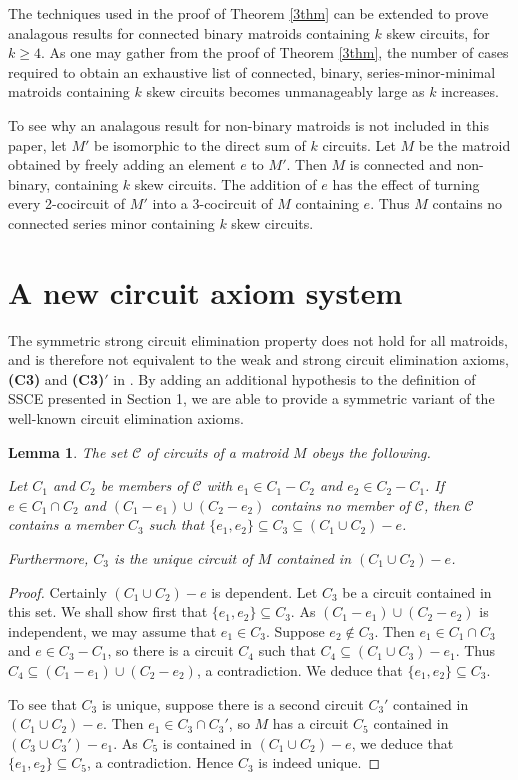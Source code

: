 \documentclass[12pt,reqno]{amsart}
\newtheorem{lemma}[theorem]{Lemma}
\theoremstyle{definition}
\theoremstyle{remark}
\numberwithin{equation}{section}
\begin{document}
The techniques used in the proof of Theorem \ref{3thm} can be extended to prove analagous results for connected binary matroids containing $k$ skew circuits, for $k\ge 4$. As one may gather from the proof of Theorem \ref{3thm}, the number of cases required to obtain an exhaustive list of connected, binary, series-minor-minimal matroids containing $k$ skew circuits becomes unmanageably large as $k$ increases.  

To see why an analagous result for non-binary matroids is not included in this paper, let $M'$ be isomorphic to the direct sum of $k$ circuits. Let $M$ be the matroid obtained by freely adding an element $e$ to $M'$. Then $M$ is connected and non-binary, containing $k$ skew circuits. The addition of $e$ has the effect of turning every 2-cocircuit of $M'$ into a 3-cocircuit of $M$ containing $e$. Thus $M$ contains no connected series minor containing $k$ skew circuits.       

\section{A new circuit axiom system}
The symmetric strong circuit elimination property does not hold for all matroids, and is therefore not equivalent to the weak and strong circuit elimination axioms, \textbf{(C3)} and \textbf{(C3)$'$} in \cite[pp.9 and 29]{ox}. By adding an additional hypothesis to the definition of SSCE presented in Section 1, we are able to provide a symmetric variant of the well-known circuit elimination axioms.


\begin{lemma} 
\label{cct}
The set ${\mathscr C}$  of circuits of a matroid $M$  obeys the following.
 \smallskip
 
  Let $C_1$ and $C_2$ be members of ${\mathscr C}$  with $e_1 \in C_1 - C_2$ and $e_2 \in C_2 - C_1$. If $e \in C_1 \cap C_2$ and $(C_1 - e_1) \cup (C_2 - e_2)$ contains no member of ${\mathscr C}$, then ${\mathscr C}$ contains a member $C_3$ such that $\{e_1,e_2\} \subseteq C_3 \subseteq (C_1 \cup C_2) - e$.  

Furthermore, $C_3$ is the unique circuit of $M$ contained in $(C_1 \cup C_2) - e$.
\end{lemma}

\begin{proof} 
Certainly $(C_1 \cup C_2) - e$ is dependent. Let $C_3$ be a circuit contained in this set. We shall show first that $\{e_1,e_2\} \subseteq C_3$. As 
$(C_1 - e_1) \cup (C_2 - e_2)$ is independent, we may assume that $e_1 \in C_3$. Suppose $e_2 \not\in C_3$. Then $e_1 \in C_1 \cap C_3$ and $e \in C_3 - C_1$, so there is a circuit $C_4$ such that $C_4 \subseteq (C_1 \cup C_3) - e_1$. Thus $C_4 \subseteq (C_1 - e_1) \cup (C_2 - e_2)$, a contradiction. We deduce that $\{e_1,e_2\} \subseteq C_3$.

To see that $C_3$ is unique, suppose there is a second circuit $C_3'$ contained in $(C_1 \cup C_2) - e$. Then $e_1 \in C_3 \cap C_3'$, so $M$ has a circuit $C_5$ contained in $(C_3 \cup C_3') - e_1$. As $C_5$ is contained in $(C_1 \cup C_2) - e$, we deduce that $\{e_1,e_2\} \subseteq C_5$, a contradiction.  Hence $C_3$ is indeed unique.
\end{proof}
\end{document}
